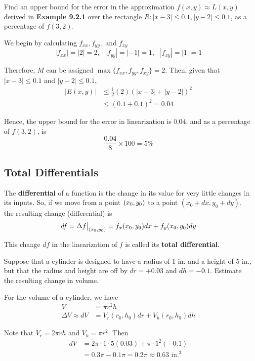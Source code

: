 \begin{example}
    \normalfont Find an upper bound for the error in the approximation $f(x, y) \approx L(x, y)$ derived in
    \textbf{Example 9.2.1} over the rectangle $R: |x - 3| \leq 0.1, |y - 2| \leq 0.1$, as a percentage of $f(3, 2)$.

    We begin by calculating $f_{xx}, f_{yy},$ and $f_{xy}$
    $$|f_{xx}| = |2| = 2, \ \ \ |f_{yy}| = |-1| = 1, \ \ \ |f_{xy}| = |1| = 1$$

    Therefore, $M$ can be assigned $\max{\{f_{xx}, f_{yy}, f_{xy}\}} = 2$. Then, given that $|x - 3| \leq 0.1$ and
    $|y - 2| \leq 0.1$,
    \begin{align*}
        |E(x, y)| &\leq \frac{1}{2} (2) (|x - 3| + |y - 2|)^2 \\
        &\leq (0.1 + 0.1) ^ 2 = 0.04
    \end{align*}

    Hence, the upper bound for the error in linearization is $0.04$, and as a percentage of $f(3, 2)$, is
    $$\frac{0.04}{8} \times 100 = 5 \%$$
\end{example}


\subsection{Total Differentials}
The \textbf{differential} of a function is the change in its value for very little changes in its inputs. So, if we move
from a point $(x_0, y_0)$ to a point $(x_0 + dx, y_0 + dy)$, the resulting change (differential) is
\begin{equation}
    df = \Delta f \big|_{(x_0, y_0)} = f_x (x_0, y_0) dx + f_y (x_0, y_0) dy
\end{equation}

This change $df$ in the linearization of $f$ is called its \textbf{total differential}.

\begin{example}
    \normalfont Suppose that a cylinder is designed to have a radius of 1 in. and a height of 5 in., but that the radius
    and height are off by $dr = +0.03$ and $dh = -0.1$. Estimate the resulting change in volume.

    For the volume of a cylinder, we have
    \begin{align*}
        V &= \pi r^2 h \\
        \Delta V \approx dV &= V_r(r_0, h_0) dr + V_h(r_0, h_0) dh
    \end{align*}

    Note that $V_r = 2 \pi r h$ and $V_h = \pi r^2$. Then
    \begin{align*}
        dV &= 2 \pi \cdot 1 \cdot 5 (0.03) + \pi \cdot 1^2 (-0.1) \\
        &= 0.3 \pi - 0.1 \pi = 0.2 \pi \approx 0.63 \text{ in.}^3
    \end{align*}
\end{example}

